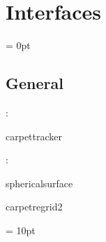 
\section{Interfaces} 


\parskip = 0pt

\vspace{3mm} \subsection*{General}

: 

carpettracker
\vspace{2mm}

: 

sphericalsurface

carpetregrid2
\vspace{2mm}

\vspace{5mm}\parskip = 10pt 
